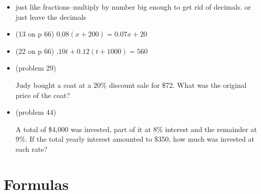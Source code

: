 \documentclass[fleqn]{article}
\begin{document}
\begin{itemize}
\item
just like fractions--multiply by number big enough to get rid of decimals.  or just leave the decimals

\item (13 on p 66)
\(0.08(x + 200) = 0.07x + 20\)
\vspace{2 in}


\item (22 on p 66)
\(.10t + 0.12(t + 1000) = 560 \)
\vspace{2 in}


\item (problem 29)

Judy bought a coat at a 20\% discount sale for \$72.  What was the original price of the coat?

\vspace{2 in}


\item (problem 44)

A total of \$4,000 was invested, part of it at 8\% interest and the remainder at 9\%.  If the total yearly interest
amounted to \$350, how much was invested at each rate?

\vspace{2 in}
\end{itemize}

\section{Formulas}
\end{document}
